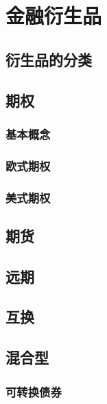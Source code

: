 \chapter{金融衍生品}
\section{衍生品的分类}

\section{期权}
\subsection{基本概念}

\subsection{欧式期权}

\subsection{美式期权}

\section{期货}

\section{远期}

\section{互换}

\section{混合型}
\subsection{可转换债券}

